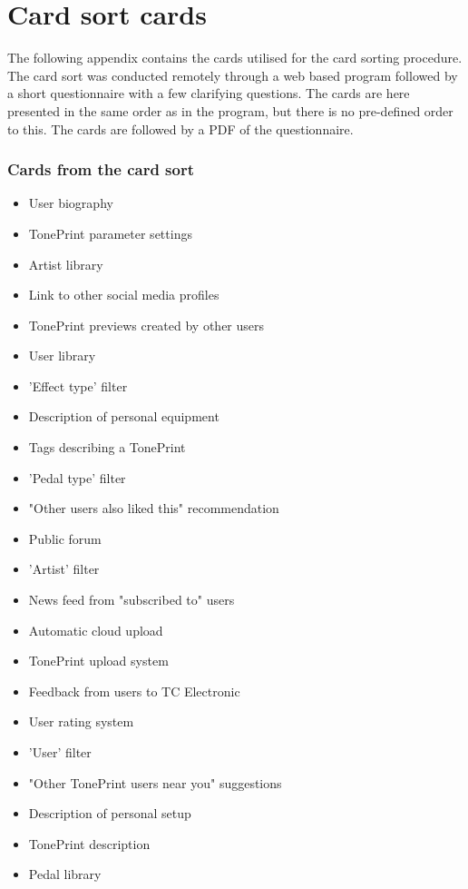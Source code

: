 \chapter{Card sort cards}
\label{App:CardSortCards}
The following appendix contains the cards utilised for the card sorting procedure. The card sort was conducted remotely through a web based program followed by a short questionnaire with a few clarifying questions. The cards are here presented in the same order as in the program, but there is no pre-defined order to this. The cards are followed by a PDF of the questionnaire.

\subsection*{Cards from the card sort}
\label{App:Cards
}
\begin{itemize}
    \item User biography
    \item TonePrint parameter settings
    \item Artist library 
    \item Link to other social media profiles
    \item TonePrint previews created by other users
    \item User library
    \item 'Effect type' filter
    \item Description of personal equipment 
    \item Tags describing a TonePrint
    \item 'Pedal type' filter
    \item "Other users also liked this" recommendation
    \item Public forum
    \item 'Artist' filter
    \item News feed from "subscribed to" users
    \item Automatic cloud upload
    \item TonePrint upload system
    \item Feedback from users to TC Electronic
    \item User rating system
    \item 'User' filter
    \item "Other TonePrint users near you" suggestions
    \item Description of personal setup
    \item TonePrint description 
    \item Pedal library

\end{itemize}
